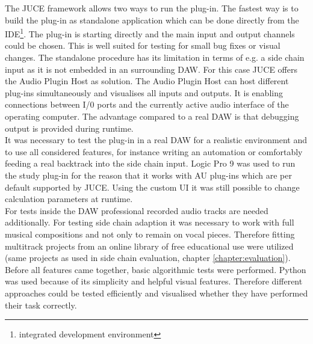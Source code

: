 The JUCE framework allows two ways to run the plug-in. The fastest way is to build the plug-in as standalone application which can be done directly from the IDE\footnote{integrated development environment}. The plug-in is starting directly and the main input and output channels could be chosen. This is well suited for testing for small bug fixes or visual changes. The standalone procedure has its limitation in terms of e.g. a side chain input as it is not embedded in an surrounding DAW. For this case JUCE offers the Audio Plugin Host as solution. The Audio Plugin Host can host different plug-ins simultaneously and visualises all inputs and outputs. It is enabling connections between I/0 ports and the currently active audio interface of the operating computer. The advantage compared to a real DAW is that debugging output is provided during runtime.\\
It was necessary to test the plug-in in a real DAW for a realistic environment and to use all considered features, for instance writing an automation or comfortably feeding a real backtrack into the side chain input. Logic Pro 9 was used to run the study plug-in for the reason that it works with AU plug-ins which are per default supported by JUCE. Using the custom UI it was still possible to change calculation parameters at runtime.\\
For tests inside the DAW professional recorded audio tracks are needed additionally. For testing side chain adaption it was necessary to work with full musical compositions and not only to remain on vocal pieces. Therefore fitting multitrack projects from an online library\cite{MultiT} of free educational use were utilized (same projects as used in side chain evaluation, chapter \ref{chapter:evaluation}).\\
Before all features came together, basic algorithmic tests were performed. Python was used because of its simplicity and helpful visual features. Therefore different approaches could be tested efficiently and visualised whether they have performed their task correctly.\\
